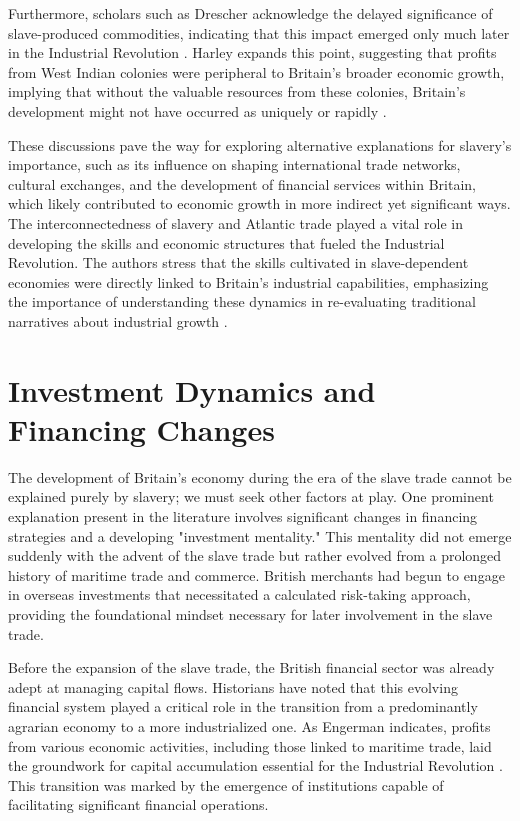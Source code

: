 \documentclass[a4paper,11pt]{article}
\begin{document}
Furthermore, scholars such as Drescher acknowledge the delayed significance of slave-produced commodities, indicating that this impact emerged only much later in the Industrial Revolution \citep{drescher1997}. Harley expands this point, suggesting that profits from West Indian colonies were peripheral to Britain's broader economic growth, implying that without the valuable resources from these colonies, Britain's development might not have occurred as uniquely or rapidly \citep{harley2015}.

These discussions pave the way for exploring alternative explanations for slavery's importance, such as its influence on shaping international trade networks, cultural exchanges, and the development of financial services within Britain, which likely contributed to economic growth in more indirect yet significant ways. The interconnectedness of slavery and Atlantic trade played a vital role in developing the skills and economic structures that fueled the Industrial Revolution. The authors stress that the skills cultivated in slave-dependent economies were directly linked to Britain's industrial capabilities, emphasizing the importance of understanding these dynamics in re-evaluating traditional narratives about industrial growth \citep{berghudson2021}.

\section{Investment Dynamics and Financing Changes}

The development of Britain's economy during the era of the slave trade cannot be explained purely by slavery; we must seek other factors at play. One prominent explanation present in the literature involves significant changes in financing strategies and a developing "investment mentality." This mentality did not emerge suddenly with the advent of the slave trade but rather evolved from a prolonged history of maritime trade and commerce. British merchants had begun to engage in overseas investments that necessitated a calculated risk-taking approach, providing the foundational mindset necessary for later involvement in the slave trade.

Before the expansion of the slave trade, the British financial sector was already adept at managing capital flows. Historians have noted that this evolving financial system played a critical role in the transition from a predominantly agrarian economy to a more industrialized one. As Engerman indicates, profits from various economic activities, including those linked to maritime trade, laid the groundwork for capital accumulation essential for the Industrial Revolution \citep{eltisengerman2000}. This transition was marked by the emergence of institutions capable of facilitating significant financial operations.
\end{document}
